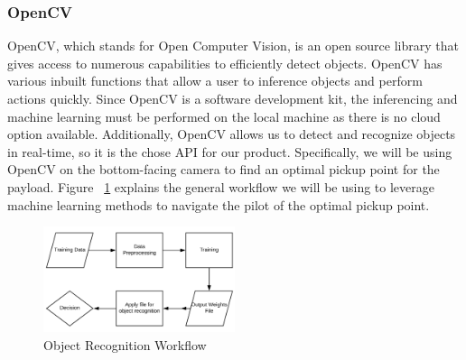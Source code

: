 \documentclass[onecolumn, draftclsnofoot, 10pt, compsoc]{IEEEtran}
\begin{document}
\subsubsection{OpenCV}
OpenCV, which stands for Open Computer Vision, is an open source library that gives access to numerous capabilities to efficiently detect objects. OpenCV has various inbuilt functions that allow a user to inference objects and perform actions quickly. Since OpenCV is a software development kit, the inferencing and machine learning must be performed on the local machine as there is no cloud option available. Additionally, OpenCV allows us to detect and recognize objects in real-time, so it is the chose API for our product. Specifically, we will be using OpenCV on the bottom-facing camera to find an optimal pickup point for the payload. Figure ~\ref{fig:ObjectRecognitionWorkflow} explains the general workflow we will be using to leverage machine learning methods to navigate the pilot of the optimal pickup point.

\begin{figure}[h!]
    \centering
    \includegraphics[width=0.5\textwidth]{graphics/object_recognition_workflow.png}
    \caption{Object Recognition Workflow}
    \label{fig:ObjectRecognitionWorkflow}
\end{figure}
\end{document}
